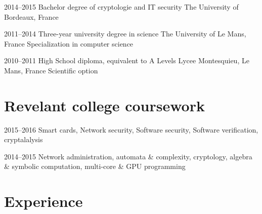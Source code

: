 \documentclass[]{friggeri-cv} %
\begin{document}
\begin{entrylist}


\entry
{2014--2015}
{Bachelor degree of cryptologie and IT security}
{The University of Bordeaux, France}


\entry
{2011--2014}
{Three-year university degree in science}
{The University of Le Mans, France}
{Specialization in computer science}




\entry
{2010--2011}
{High School diploma, equivalent to A Levels}
{Lycee Montesquieu, Le Mans, France}
{Scientific option}


\end{entrylist}


\section{Revelant college coursework}

\begin{entrylist}


\entry
{2015--2016}
{Smart cards, Network security, Software security, Software verification, cryptalalysis}
{}

\entry
{2014--2015}
{Network administration, automata \& complexity, cryptology, algebra \& symbolic computation, multi-core \& GPU programming}
{}

\end{entrylist}


\section{Experience}
\end{document}
